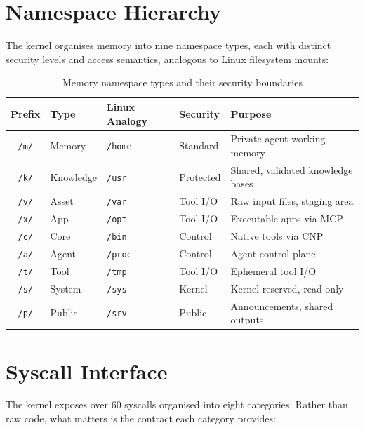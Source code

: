 \section{Namespace Hierarchy}

The kernel organises memory into nine namespace types, each with distinct
security levels and access semantics, analogous to Linux filesystem mounts:

\begin{table}[H]
\centering
\renewcommand{\arraystretch}{1.4}
\begin{tabular}{@{}cllll@{}}
\toprule
\textbf{Prefix} & \textbf{Type} & \textbf{Linux Analogy} & \textbf{Security} & \textbf{Purpose} \\
\midrule
\texttt{/m/} & Memory     & \texttt{/home} & Standard & Private agent working memory \\
\texttt{/k/} & Knowledge  & \texttt{/usr}  & Protected & Shared, validated knowledge bases \\
\texttt{/v/} & Asset      & \texttt{/var}  & Tool I/O & Raw input files, staging area \\
\texttt{/x/} & App        & \texttt{/opt}  & Tool I/O & Executable apps via MCP \\
\texttt{/c/} & Core       & \texttt{/bin}  & Control  & Native tools via CNP \\
\texttt{/a/} & Agent      & \texttt{/proc} & Control  & Agent control plane \\
\texttt{/t/} & Tool       & \texttt{/tmp}  & Tool I/O & Ephemeral tool I/O \\
\texttt{/s/} & System     & \texttt{/sys}  & Kernel   & Kernel-reserved, read-only \\
\texttt{/p/} & Public     & \texttt{/srv}  & Public   & Announcements, shared outputs \\
\bottomrule
\end{tabular}
\caption{Memory namespace types and their security boundaries}
\end{table}

\section{Syscall Interface}

The kernel exposes over 60 syscalls organised into eight categories.
Rather than raw code, what matters is the contract each category provides:

